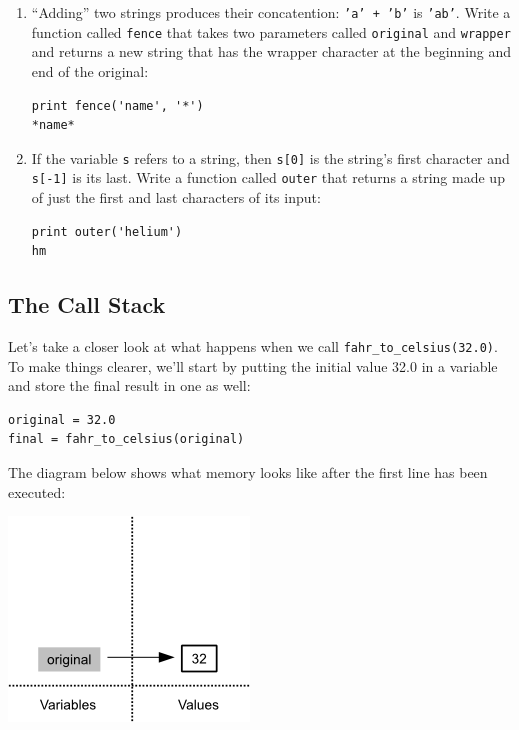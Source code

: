 \documentclass[]{book}
\begin{document}
\begin{enumerate}
\item
  ``Adding'' two strings produces their concatention: \texttt{'a' + 'b'}
  is \texttt{'ab'}. Write a function called \texttt{fence} that takes
  two parameters called \texttt{original} and \texttt{wrapper} and
  returns a new string that has the wrapper character at the beginning
  and end of the original:

\begin{verbatim}
print fence('name', '*')
*name*
\end{verbatim}
\item
  If the variable \texttt{s} refers to a string, then \texttt{s{[}0{]}}
  is the string's first character and \texttt{s{[}-1{]}} is its last.
  Write a function called \texttt{outer} that returns a string made up
  of just the first and last characters of its input:

\begin{verbatim}
print outer('helium')
hm
\end{verbatim}
\end{enumerate}

\subsection{The Call Stack}

Let's take a closer look at what happens when we call
\texttt{fahr\_to\_celsius(32.0)}. To make things clearer, we'll start by
putting the initial value 32.0 in a variable and store the final result
in one as well:

\begin{verbatim}
original = 32.0
final = fahr_to_celsius(original)
\end{verbatim}

The diagram below shows what memory looks like after the first line has
been executed:

\includegraphics{novice/python/img/python-call-stack-01.png}
\end{document}
